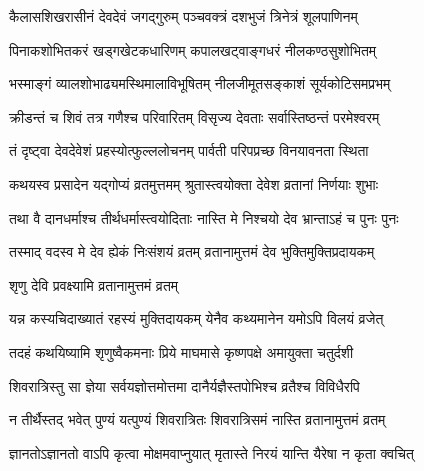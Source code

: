 
\ganapatyadiDhyanam

\lingaPuranam



\twolineshloka
{कैलासशिखरासीनं देवदेवं जगद्गुरुम्}
{पञ्चवक्त्रं दशभुजं त्रिनेत्रं शूलपाणिनम्}%

\twolineshloka
{पिनाकशोभितकरं खड्गखेटकधारिणम्}
{कपालखट्वाङ्गधरं नीलकण्ठसुशोभितम्}%

\twolineshloka
{भस्माङ्गं व्यालशोभाढ्यमस्थिमालाविभूषितम्}
{नीलजीमूतसङ्काशं सूर्यकोटिसमप्रभम्}%

\twolineshloka
{क्रीडन्तं च शिवं तत्र गणैश्च परिवारितम्}
{विसृज्य देवताः सर्वास्तिष्ठन्तं परमेश्वरम्}%

\twolineshloka
{तं दृष्ट्वा देवदेवेशं प्रहस्योत्फुल्ललोचनम्}
{पार्वती परिपप्रच्छ विनयावनता स्थिता}%


\twolineshloka
{कथयस्व प्रसादेन यद्गोप्यं व्रतमुत्तमम्}
{श्रुतास्त्वयोक्ता देवेश व्रतानां निर्णयाः शुभाः}%

\twolineshloka
{तथा वै दानधर्माश्च तीर्थधर्मास्त्वयोदिताः}
{नास्ति मे निश्चयो देव भ्रान्ताऽहं च पुनः पुनः}%

\twolineshloka
{तस्माद् वदस्व मे देव ह्येकं निःसंशयं व्रतम्}
{व्रतानामुत्तमं देव भुक्तिमुक्तिप्रदायकम्}%



\onelineshloka
{शृणु देवि प्रवक्ष्यामि\footnotemark{} व्रतानामुत्तमं व्रतम्}%

\twolineshloka
{यन्न कस्यचिदाख्यातं रहस्यं मुक्तिदायकम्}
{येनैव कथ्यमानेन यमोऽपि विलयं व्रजेत्}%

\twolineshloka
{तदहं कथयिष्यामि शृणुष्वैकमनाः प्रिये}
{माघमासे कृष्णपक्षे अमायुक्ता चतुर्दशी\footnotemark{}}%

\twolineshloka
{शिवरात्रिस्तु सा ज्ञेया सर्वयज्ञोत्तमोत्तमा}
{दानैर्यज्ञैस्तपोभिश्च व्रतैश्च विविधैरपि}%

\twolineshloka
{न तीर्थैस्तद् भवेत् पुण्यं यत्पुण्यं शिवरात्रितः}
{शिवरात्रिसमं नास्ति व्रतानामुत्तमं व्रतम्}%

\twolineshloka
{ज्ञानतोऽज्ञानतो वाऽपि कृत्वा मोक्षमवाप्नुयात्}
{मृतास्ते निरयं यान्ति यैरेषा न कृता क्वचित्}%

